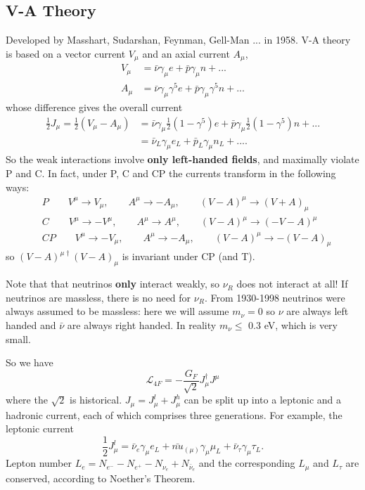 \documentclass[a4paper,12pt]{article}
\begin{document}
\subsection{V-A Theory}
%
Developed by Masshart, Sudarshan, Feynman, Gell-Man ... in 1958. V-A theory is based on a vector current $V_\mu$ and an axial current $A_\mu$,
\begin{equation}
\begin{split}
V_\mu &= \bar{\nu}\gamma_\mu e + \bar{p}\gamma_\mu n + ... \\
A_\mu &= \bar{\nu}\gamma_\mu \gamma^5 e + \bar{p}\gamma_\mu \gamma^5 n + ...
\end{split}
\end{equation}
whose difference gives the overall current
\begin{equation}
\begin{split}
\frac{1}{2}J_\mu = \frac{1}{2}(V_\mu - A_\mu)  &= \bar{\nu}\gamma_\mu\frac{1}{2}(1-\gamma^5) e + \bar{p}\gamma_\mu\frac{1}{2}(1-\gamma^5) n + ... \\
&= \bar{\nu}_L\gamma_\mu e_L + \bar{p}_L\gamma_\mu n_L + ... .
\end{split}
\end{equation}
So the weak interactions involve \textbf{only left-handed fields}, and maximally violate P and C. In fact, under P, C and CP the currents transform in the following ways:
\begin{equation}
\begin{split}
&P \qquad V^\mu \to V_\mu, \qquad A^\mu \to -A_\mu, \qquad (V-A)^\mu \to (V+A)_\mu \\
&C \qquad V^\mu \to -V^\mu, \qquad A^\mu \to A^\mu, \qquad (V-A)^\mu \to (-V-A)^\mu \\
&CP \qquad V^\mu \to -V_\mu, \qquad A^\mu \to -A_\mu, \qquad (V-A)^\mu \to -(V-A)_\mu 
\end{split}
\end{equation}
so $(V-A)^{\mu \dagger}(V-A)_\mu$ is invariant under CP (and T). 

Note that that neutrinos \textbf{only} interact weakly, so $\nu_R$ does not interact at all! If neutrinos are massless, there is no need for $\nu_R$. From 1930-1998 neutrinos were always assumed to be massless: here we will assume $m_\nu=0$ so $\nu$ are always left handed and $\bar{\nu}$ are always right handed. In reality $m_\nu \leq$ 0.3 eV, which is very small.

So we have
%
\begin{equation}
\mathcal{L}_{4F} = -\frac{G_F}{\sqrt{2}} J_\mu^\dagger J^\mu
\end{equation}
where the $\sqrt{2}$ is historical. $J_\mu = J_\mu^l + J_\mu^h$ can be split up into a leptonic and a hadronic current, each of which comprises three generations. For example, the leptonic current
\begin{equation}
\frac{1}{2}J_\mu^l = \bar{\nu}_e\gamma_\mu e_L + \bar{nu}_{(\mu)}\gamma_\mu \mu_L + \bar{\nu}_\tau \gamma_\mu \tau_L.
\end{equation}
Lepton number $L_e = N_{e^-} - N_{e^+} - N_{\nu_e} + N_{\bar{\nu}_e}$ and the corresponding $L_\mu$ and $L_\tau$ are conserved, according to Noether's Theorem.  
\end{document}

